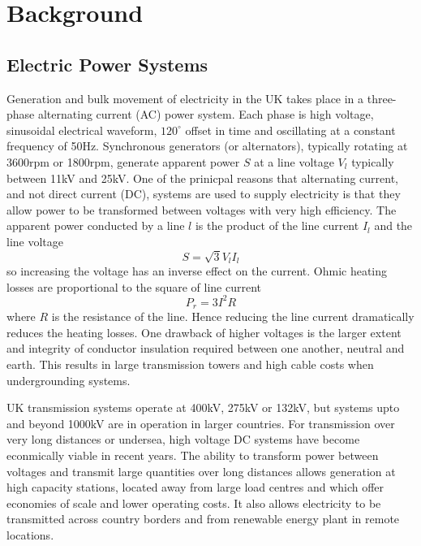 \chapter{Background}
\label{ch:background}


\section{Electric Power Systems}
Generation and bulk movement of electricity in the UK takes place in a
three-phase alternating current (AC) power system.  Each phase is
high voltage, sinusoidal electrical waveform, $120^\circ$ offset in time
and oscillating at a constant frequency of 50Hz.  Synchronous generators (or
alternators), typically rotating at 3600rpm or 1800rpm, generate apparent power
$S$ at a line voltage $V_l$ typically between
11kV and 25kV.  One of the prinicpal reasons that alternating current, and not
direct current (DC), systems are used to supply electricity is that they allow
power to be transformed between voltages with very high efficiency.  The
apparent power conducted by a line $l$ is the product of the line current
$I_l$ and the line voltage
\begin{equation}
S = \sqrt{3} V_l I_l
\end{equation}
so increasing the voltage has an inverse effect on the current.
Ohmic heating losses are proportional to the square of line current
\begin{equation}
P_{r} = 3 I^2 R
\end{equation}
where $R$ is the resistance of the line.  Hence reducing the line current
dramatically reduces the heating losses.  One drawback of higher voltages
is the larger extent and integrity of conductor insulation required between
one another, neutral and earth.  This results in large transmission towers and
high cable costs when undergrounding systems.

UK transmission systems operate at 400kV, 275kV or 132kV, but systems upto
and beyond 1000kV are in operation in larger countries.  For transmission over
very long distances or undersea, high voltage DC systems have become
econmically viable in recent years.  The ability to transform power between
voltages and transmit large quantities over long distances allows
generation at high capacity stations, located away from large load centres and
which offer economies of scale and lower operating costs.  It also allows
electricity to be transmitted across country borders and from renewable energy
plant in remote locations.

